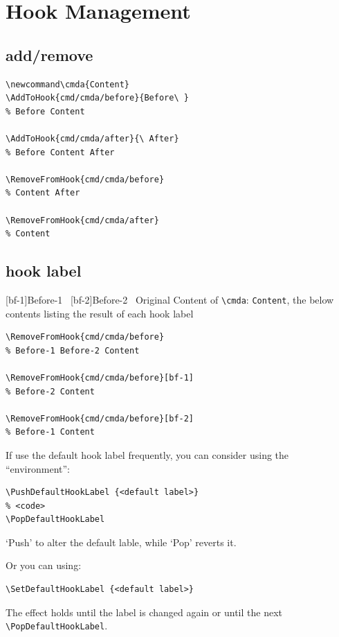 \documentclass{article}
\newcommand\tbh{\textbackslash}
\newcommand\cmda{Content}
\begin{document}
\tableofcontents
\newpage

\section{Hook Management}
\subsection{add/remove}
\begin{lstlisting}
\newcommand\cmda{Content}
\AddToHook{cmd/cmda/before}{Before\ }
% Before Content

\AddToHook{cmd/cmda/after}{\ After}
% Before Content After

\RemoveFromHook{cmd/cmda/before}
% Content After

\RemoveFromHook{cmd/cmda/after}
% Content
\end{lstlisting}


\subsection{hook label}
[bf-1]{Before-1\ }
[bf-2]{Before-2\ }
\quad Original Content of \texttt{\tbh cmda}: \texttt{\cmda}, the below contents listing the result of each hook label\par

\begin{lstlisting}
\RemoveFromHook{cmd/cmda/before}
% Before-1 Before-2 Content

\RemoveFromHook{cmd/cmda/before}[bf-1]
% Before-2 Content

\RemoveFromHook{cmd/cmda/before}[bf-2]
% Before-1 Content
\end{lstlisting}

If use the default hook label frequently, you can consider using the ``environment'':
\begin{lstlisting}
\PushDefaultHookLabel {<default label>}
% <code>
\PopDefaultHookLabel
\end{lstlisting}

`Push' to alter the default lable, while `Pop' reverts it.

Or you can using:
\begin{lstlisting}
\SetDefaultHookLabel {<default label>}
\end{lstlisting}

The effect holds until the label is changed again or until the next \texttt{\tbh PopDefaultHookLabel}.
\end{document}

